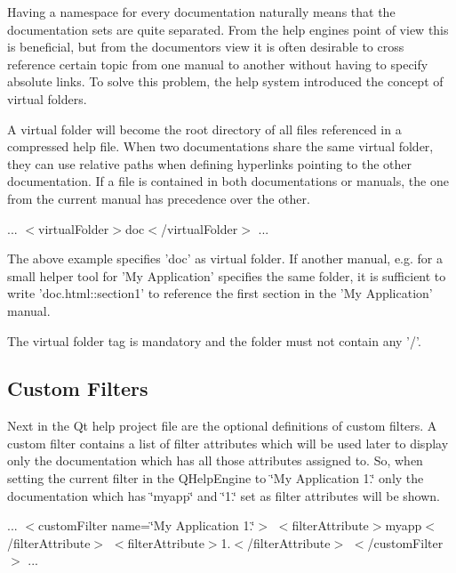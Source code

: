 Having a namespace for every documentation naturally means that the documentation sets are quite separated. From the help engines point of view this is beneficial, but from the documentors view it is often desirable to cross reference certain topic from one manual to another without having to specify absolute links. To solve this problem, the help system introduced the concept of virtual folders.

A virtual folder will become the root directory of all files referenced in a compressed help file. When two documentations share the same virtual folder, they can use relative paths when defining hyperlinks pointing to the other documentation. If a file is contained in both documentations or manuals, the one from the current manual has precedence over the other.

... $<$virtual\-Folder$>$doc$<$/virtual\-Folder$>$ ...

The above example specifies 'doc' as virtual folder. If another manual, e.\-g. for a small helper tool for 'My Application' specifies the same folder, it is sufficient to write 'doc.\-html\-::section1' to reference the first section in the 'My Application' manual.

The virtual folder tag is mandatory and the folder must not contain any '/'.\hypertarget{helpproject_hp_customfilters}{}\subsection{Custom Filters}\label{helpproject_hp_customfilters}
Next in the Qt help project file are the optional definitions of custom filters. A custom filter contains a list of filter attributes which will be used later to display only the documentation which has all those attributes assigned to. So, when setting the current filter in the Q\-Help\-Engine to \char`\"{}\-My 
\-Application 1.\char`\"{} only the documentation which has \char`\"{}myapp\char`\"{} and \char`\"{}1.\char`\"{} set as filter attributes will be shown.

... $<$custom\-Filter name=\char`\"{}\-My Application 1.\char`\"{}$>$ $<$filter\-Attribute$>$myapp$<$/filter\-Attribute$>$ $<$filter\-Attribute$>$1.$<$/filter\-Attribute$>$ $<$/custom\-Filter$>$ ...

